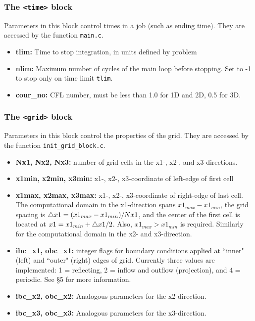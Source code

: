 \subsubsection{The {\tt <time>} block}

Parameters in this block control times in a job (such as ending time).
They are accessed by the function {\tt main.c}.
\begin{itemize}

\item {\bf tlim:} Time to stop integration, in units defined by problem

\item {\bf nlim:} Maximum number of cycles of the main loop before stopping.
Set to -1 to stop only on time limit {\tt tlim}.

\item {\bf cour\_no:}  CFL number, must be less than 1.0 for 1D and 2D, 0.5
for 3D.

\end{itemize}

\subsubsection{The {\tt <grid>} block}

Parameters in this block control the properties of the grid. 
They are accessed by the function {\tt init\_grid\_block.c}.
\begin{itemize}

\item {\bf Nx1, Nx2, Nx3:} number of grid cells in the x1-, x2-, and x3-directions.

\item {\bf x1min, x2min, x3min:} x1-, x2-, x3-coordinate of left-edge of first cell

\item {\bf x1max, x2max, x3max:} x1-, x2-, x3-coordinate of right-edge of last cell.
The computational domain in the x1-direction spans $x1_{max}-x1_{min}$, the grid
spacing is $\bigtriangleup x1=(x1_{max}-x1_{min})/Nx1$, and the center of the
first cell is located at $x1=x1_{min} + \bigtriangleup x1/2$. Also, $x1_{max} >
x1_{min}$ is required.  Similarly for the computational domain in the 
x2- and x3-direction.

\item {\bf ibc\_x1, obc\_x1:} integer flags for boundary conditions applied
at ``inner" (left) and ``outer" (right) edges of grid.  Currently three
values are implemented: 1 = reflecting, 2 = inflow and outflow (projection), 
and 4 = periodic.  See \S 5 for more information.

\item {\bf ibc\_x2, obc\_x2:} Analogous parameters for the x2-direction.

\item {\bf ibc\_x3, obc\_x3:} Analogous parameters for the x3-direction.

\end{itemize}

